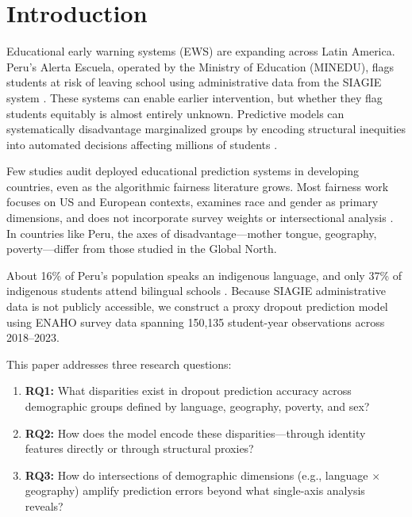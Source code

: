 \documentclass[notitlepage,12pt]{jedm}
\begin{document}
\section{Introduction}

Educational early warning systems (EWS) are expanding across Latin America. Peru's Alerta Escuela, operated by the Ministry of Education (MINEDU), flags students at risk of leaving school using administrative data from the SIAGIE system \cite{minedu2023alerta}. These systems can enable earlier intervention, but whether they flag students equitably is almost entirely unknown. Predictive models can systematically disadvantage marginalized groups by encoding structural inequities into automated decisions affecting millions of students \cite{barocas2016big,mitchell2021algorithmic}.

Few studies audit deployed educational prediction systems in developing countries, even as the algorithmic fairness literature grows. Most fairness work focuses on US and European contexts, examines race and gender as primary dimensions, and does not incorporate survey weights or intersectional analysis \cite{kizilcec2020algorithmic,baker2022algorithmic,gardner2024debiasing}. In countries like Peru, the axes of disadvantage---mother tongue, geography, poverty---differ from those studied in the Global North.

About 16\% of Peru's population speaks an indigenous language, and only 37\% of indigenous students attend bilingual schools \cite{cueto2009explaining,cueto2016education}. Because SIAGIE administrative data is not publicly accessible, we construct a proxy dropout prediction model using ENAHO survey data \cite{inei2023enaho} spanning 150,135 student-year observations across 2018--2023.

This paper addresses three research questions:
\begin{enumerate}
  \item \textbf{RQ1:} What disparities exist in dropout prediction accuracy across demographic groups defined by language, geography, poverty, and sex?
  \item \textbf{RQ2:} How does the model encode these disparities---through identity features directly or through structural proxies?
  \item \textbf{RQ3:} How do intersections of demographic dimensions (e.g., language $\times$ geography) amplify prediction errors beyond what single-axis analysis reveals?
\end{enumerate}
\end{document}

